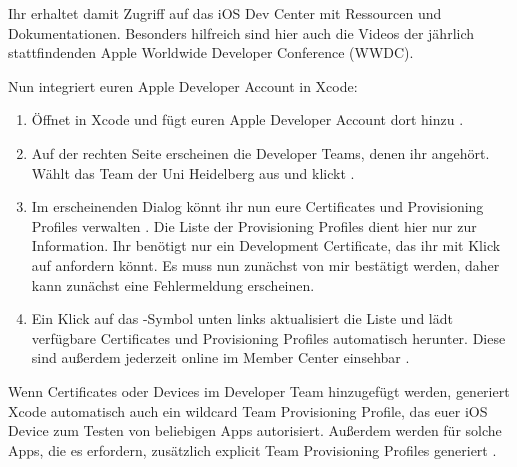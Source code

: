 \documentclass[parskip=half, final]{scrreprt}
\begin{document}

Ihr erhaltet damit Zugriff auf das iOS Dev Center  mit Ressourcen und Dokumentationen. Besonders hilfreich sind hier auch die Videos der jährlich stattfindenden Apple Worldwide Developer Conference (WWDC).

Nun integriert euren Apple Developer Account in Xcode:
\begin{enumerate}
\item Öffnet in Xcode  und fügt euren Apple Developer Account dort hinzu .
\item Auf der rechten Seite erscheinen die Developer Teams, denen ihr angehört. Wählt das Team der Uni Heidelberg aus und klickt .
\item Im erscheinenden Dialog könnt ihr nun eure Certificates und Provisioning Profiles verwalten . Die Liste der Provisioning Profiles dient hier nur zur Information. Ihr benötigt nur ein Development Certificate, das ihr mit Klick auf  anfordern könnt. Es muss nun zunächst von mir bestätigt werden, daher kann zunächst eine Fehlermeldung erscheinen.
\item Ein Klick auf das -Symbol unten links aktualisiert die Liste und lädt verfügbare Certificates und Provisioning Profiles automatisch herunter. Diese sind außerdem jederzeit online im Member Center einsehbar .
\end{enumerate}



Wenn Certificates oder Devices im Developer Team hinzugefügt werden, generiert Xcode automatisch auch ein wildcard Team Provisioning Profile, das euer iOS Device zum Testen von beliebigen Apps autorisiert. Außerdem werden für solche Apps, die es erfordern, zusätzlich explicit Team Provisioning Profiles generiert .
\end{document}
